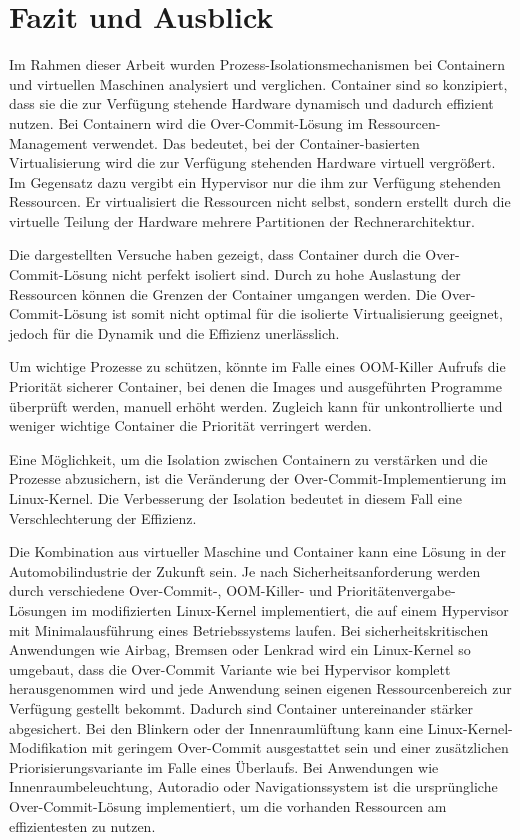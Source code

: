 \thispagestyle{empty}
\section{Fazit und Ausblick}

Im Rahmen dieser Arbeit wurden Prozess-Isolationsmechanismen bei Containern und virtuellen Maschinen analysiert und verglichen. Container sind so konzipiert, dass sie die zur Verfügung stehende Hardware dynamisch und dadurch effizient nutzen. Bei Containern wird die Over-Commit-Lösung im Ressourcen-Management verwendet. Das bedeutet, bei der Container-basierten Virtualisierung wird die zur Verfügung stehenden Hardware virtuell vergrößert. Im Gegensatz dazu vergibt ein Hypervisor nur die ihm zur Verfügung stehenden Ressourcen. Er virtualisiert die Ressourcen nicht selbst, sondern erstellt durch die virtuelle Teilung der Hardware mehrere Partitionen der Rechnerarchitektur. 

Die dargestellten Versuche haben gezeigt, dass Container durch die Over-Commit-Lösung nicht perfekt isoliert sind. Durch zu hohe Auslastung der Ressourcen können die Grenzen der Container umgangen werden. Die Over-Commit-Lösung ist somit nicht optimal für die isolierte Virtualisierung geeignet, jedoch für die Dynamik und die Effizienz unerlässlich.

Um wichtige Prozesse zu schützen, könnte im Falle eines OOM-Killer Aufrufs die Priorität sicherer Container, bei denen die Images und ausgeführten Programme überprüft werden, manuell erhöht werden. Zugleich kann für unkontrollierte und weniger wichtige Container die Priorität verringert werden.

Eine Möglichkeit, um die Isolation zwischen Containern zu verstärken und die Prozesse abzusichern, ist die Veränderung der Over-Commit-Implementierung im Linux-Kernel. Die Verbesserung der Isolation bedeutet in diesem Fall eine Verschlechterung der Effizienz. 

Die Kombination aus virtueller Maschine und Container kann eine Lösung in der Automobilindustrie der Zukunft sein. Je nach Sicherheitsanforderung werden durch verschiedene Over-Commit-, OOM-Killer- und Prioritätenvergabe-Lösungen im modifizierten Linux-Kernel implementiert, die auf einem Hypervisor mit Minimalausführung eines Betriebssystems laufen. Bei sicherheitskritischen Anwendungen wie Airbag, Bremsen oder Lenkrad wird ein Linux-Kernel so umgebaut, dass die Over-Commit Variante wie bei Hypervisor komplett herausgenommen wird und jede Anwendung seinen eigenen Ressourcenbereich zur Verfügung gestellt bekommt. Dadurch sind Container untereinander stärker abgesichert. Bei den Blinkern oder der Innenraumlüftung kann eine Linux-Kernel-Modifikation mit geringem Over-Commit ausgestattet sein und einer zusätzlichen Priorisierungsvariante im Falle eines Überlaufs. Bei Anwendungen wie Innenraumbeleuchtung, Autoradio oder Navigationssystem ist die ursprüngliche Over-Commit-Lösung implementiert, um die vorhanden Ressourcen am effizientesten zu nutzen.

